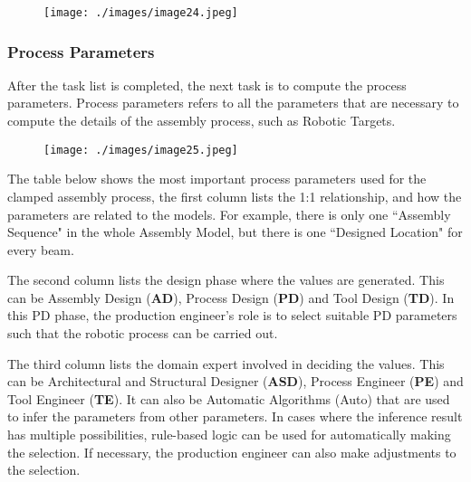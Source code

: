 \begin{figure}[H]
\texttt{[image: ./images/image24.jpeg]}
\end{figure}


\subsubsection{Process Parameters}

After the task list is completed, the next task is to compute the process parameters. Process parameters refers to all the parameters that are necessary to compute the details of the assembly process, such as Robotic Targets.

\begin{figure}[H]
\texttt{[image: ./images/image25.jpeg]}
\end{figure}


The table below shows the most important process parameters used for the clamped assembly process, the first column lists the 1:1 relationship, and how the parameters are related to the models. For example, there is only one ``Assembly Sequence" in the whole Assembly Model, but there is one ``Designed Location" for every beam.

The second column lists the design phase where the values are generated. This can be Assembly Design (\textbf{AD}), Process Design (\textbf{PD}) and Tool Design (\textbf{TD}). In this PD phase, the production engineer’s role is to select suitable PD parameters such that the robotic process can be carried out. 

The third column lists the domain expert involved in deciding the values. This can be Architectural and Structural Designer (\textbf{ASD}), Process Engineer (\textbf{PE}) and Tool Engineer (\textbf{TE}). It can also be Automatic Algorithms (Auto) that are used to infer the parameters from other parameters. In cases where the inference result has multiple possibilities, rule-based logic can be used for automatically making the selection. If necessary, the production engineer can also make adjustments to the selection.

